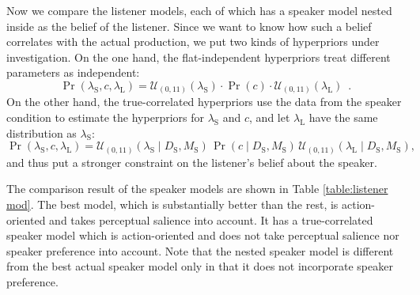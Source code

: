 Now we compare the listener models, each of which has a speaker model nested inside as the belief of the listener. Since we want to know how such a belief correlates with the actual production, we put two kinds of hyperpriors under investigation. On the one hand, the flat-independent hyperpriors treat different parameters as  independent:
\begin{equation}\label{hyper-listener-independent}
\Pr(\lambda_\mathrm{S},c,\lambda_\mathrm{L})=\mathcal{U}_{(0,11)}(\lambda_\mathrm{S}) \cdot \Pr(c) \cdot  \mathcal{U}_{(0,11)}( \lambda_\mathrm{L}) \enspace .
\end{equation}
On the other hand, the true-correlated hyperpriors use the data from the speaker condition to estimate the hyperpriors for $\lambda_\mathrm{S}$ and $c$, and let $\lambda_\mathrm{L}$ have the same distribution as $\lambda_\mathrm{S}$:
\begin{equation}\label{hyper-listener-independent}
\Pr(\lambda_\mathrm{S},c,\lambda_\mathrm{L})=\mathcal{U}_{(0,11)}(\lambda_\mathrm{S} \mid D_\mathrm{S}, M_\mathrm{S}) \,\Pr(c\mid D_\mathrm{S}, M_\mathrm{S})  \,\mathcal{U}_{(0,11)}( \lambda_\mathrm{L} \mid D_\mathrm{S}, M_\mathrm{S}),
\end{equation}
and thus put a stronger constraint on the listener's belief about the speaker. 

The comparison result of the speaker models are shown in Table \ref{table:listener mod}. The best model, which is substantially better than the rest, is action-oriented and takes perceptual salience into account. It has a true-correlated speaker model which is action-oriented and does not take perceptual salience nor speaker preference into account. Note that the nested speaker model is different from the best actual speaker model only in that it does not incorporate speaker preference.  

